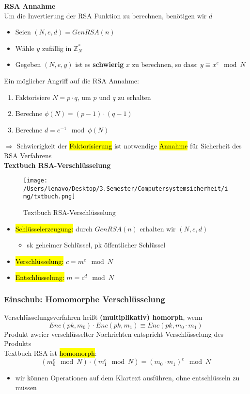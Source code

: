\documentclass[a4paper, 10pt]{article}
\begin{document}
\noindent\textbf{RSA Annahme}\\
Um die Invertierung der RSA Funktion zu berechnen, benötigen wir $d$
\begin{itemize}
    \item Seien $(N, e, d) = GenRSA(n)$
    \item Wähle $y$ zufällig in $\mathbb{Z}_N^*$
    \item Gegeben $(N, e, y)$ ist es \textbf{schwierig} $x$ zu berechnen, so dass: $y \equiv x^e \mod N$
\end{itemize}

\noindent Ein möglicher Angriff auf die RSA Annahme:
\begin{enumerate}
    \item Faktorisiere $N = p \cdot q$, um $p$ und $q$ zu erhalten
    \item Berechne $\phi (N) = (p-1) \cdot (q-1)$
    \item Berechne $d = e^{-1} \mod \phi(N)$
\end{enumerate}
$\Longrightarrow$ Schwierigkeit der \hl{Faktorisierung} ist notwendige \hl{Annahme} für Sicherheit des RSA Verfahrens\\[2mm]

\noindent\textbf{Textbuch RSA-Verschlüsselung}
\begin{figure}[h]
    \centering
    \texttt{[image: /Users/lenavo/Desktop/3.Semester/Computersystemsicherheit/img/txtbuch.png]}
    \caption{Textbuch RSA-Verschlüsselung}
    \label{fig:enter-label}
\end{figure}

\begin{itemize}
    \item \hl{Schlüsselerzeugung:} durch $GenRSA(n)$ erhalten wir $(N,e,d)$
    \begin{itemize}
        \item sk geheimer Schlüssel, pk öffentlicher Schlüssel
    \end{itemize}

    \item \hl{Verschlüsselung:} $c = m^e \mod N$
    \item \hl{Entschlüsselung:} $m = c^d \mod N$
\end{itemize}

\subsubsection{Einschub: Homomorphe Verschlüsselung}
Verschlüsselungsverfahren heißt \textbf{(multiplikativ) homorph}, wenn
\[
    Enc(pk, m_0) \cdot Enc(pk, m_1) \equiv Enc(pk, m_0 \cdot m_1)
\]
Produkt zweier verschlüsselter Nachrichten entspricht Verschlüsselung des Produkts\\
Textbuch RSA ist \hl{homomorph}:
\[
    (m_0^e \mod N) \cdot (m_1^e \mod N) = (m_0 \cdot m_1)^e \mod N
\]
\begin{itemize}
    \item wir können Operationen auf dem Klartext ausführen, ohne entschlüsseln zu müssen
\end{itemize}
\end{document}
